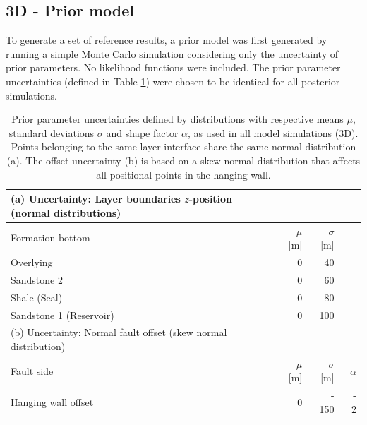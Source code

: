 		\subsection{3D - Prior model}\label{sec:prior_model3D}
		To generate a set of reference results, a prior model was first generated by running a simple Monte Carlo simulation considering only the uncertainty of prior parameters. No likelihood functions were included. The prior parameter uncertainties (defined in Table \ref{tab:3D_prior_parameters}) were chosen to be identical for all posterior simulations.
		\begin{table}[h]
		\centering
		\begin{tabular}{lrrr} 
			\toprule
			(a) Uncertainty: Layer boundaries $z$-position (normal distributions)\\  
			\midrule 
			Formation bottom & $\mu$ [m] & $\sigma$ [m]\\ 
			\midrule 
			Overlying & 0 & 40 \\
			Sandstone 2 & 0 & 60 \\
			Shale (Seal) & 0 & 80\\ 
			Sandstone 1 (Reservoir) & 0 & 100 \\
			\bottomrule
			\toprule
			(b) Uncertainty: Normal fault offset (skew normal distribution)\\
			\midrule
			Fault side & $\mu$ [m] & $\sigma$ [m] & $\alpha$\\
			\midrule
			Hanging wall offset & 0 & -~150 & -~2\\
			\bottomrule 
		\end{tabular}
		\caption{Prior parameter uncertainties defined by distributions with respective means $\mu$, standard deviations $\sigma$ and shape factor $\alpha$, as used in all model simulations (3D). Points belonging to the same layer interface share the same normal distribution (a). The offset uncertainty (b) is based on a skew normal distribution that affects all positional points in the hanging wall.}
		\label{tab:3D_prior_parameters}
		\end{table}
